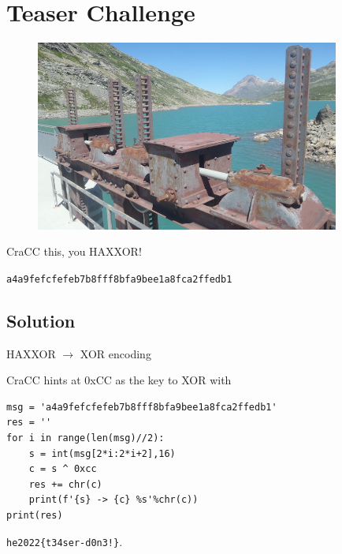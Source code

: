 
\hypertarget{he22.teaser}{%
\chapter{Teaser Challenge}\label{hv22.teaser}}

\begin{figure}
	\includegraphics[width=100mm]{00teaser/banner.jpg}
\end{figure}

\begin{center}
CraCC this, you HAXXOR!

\verb+a4a9fefcfefeb7b8fff8bfa9bee1a8fca2ffedb1+
\end{center}

\section{Solution}\label{he22.01-solution}

HAXXOR $\rightarrow$ XOR encoding

\noindent CraCC hints at 0xCC as the key to XOR with

\begin{verbatim}
msg = 'a4a9fefcfefeb7b8fff8bfa9bee1a8fca2ffedb1'
res = ''
for i in range(len(msg)//2):
    s = int(msg[2*i:2*i+2],16)
    c = s ^ 0xcc
    res += chr(c)
    print(f'{s} -> {c} %s'%chr(c)) 
print(res)
\end{verbatim}

\noindent \verb+he2022{t34ser-d0n3!}+.

